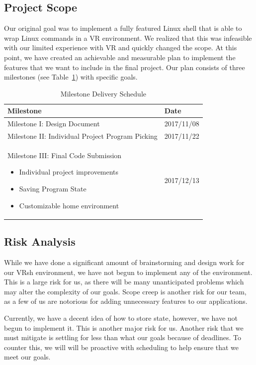 \documentclass[titlepage,12pt]{article}
\newcommand\name{VRsh\xspace}
\begin{document}
\subsection{Project Scope}
Our original goal was to implement a fully featured Linux shell that is able to
wrap Linux commands in a VR environment. We realized that this was infeasible
with our limited experience with VR and quickly changed the scope. At this
point, we have created an achievable and measurable plan to implement the
features that we want to include in the final project. Our plan consists of
three milestones (see Table~\ref{tab:milestones}) with specific goals.

\begin{table}[H]
    \caption{Milestone Delivery Schedule}\label{tab:milestones}
    \centering
    \begin{tabular}{|p{10cm}|l|}
        \hline
        \textbf{Milestone} & \textbf{Date} \\
        \hline\hline
        Milestone I: Design Document & 2017/11/08 \\
        \hline
        Milestone II: Individual Project Program Picking & 2017/11/22 \\
        \hline
        Milestone III: Final Code Submission
        \begin{itemize}
            \item Individual project improvements
            \item Saving Program State
            \item Customizable home environment
        \end{itemize} & 2017/12/13\\
        \hline
    \end{tabular}
\end{table}

\subsection{Risk Analysis}
While we have done a significant amount of brainstorming and design work for our
\name environment, we have not begun to implement any of the environment.  This
is a large risk for us, as there will be many unanticipated problems which may
alter the complexity of our goals. Scope creep is another risk for our team, as
a few of us are notorious for adding unnecessary features to our applications.

Currently, we have a decent idea of how to store state, however, we have not
begun to implement it. This is another major risk for us. Another risk that we
must mitigate is settling for less than what our goals because of deadlines. To
counter this, we will will be proactive with scheduling to help ensure that we
meet our goals.
\end{document}

